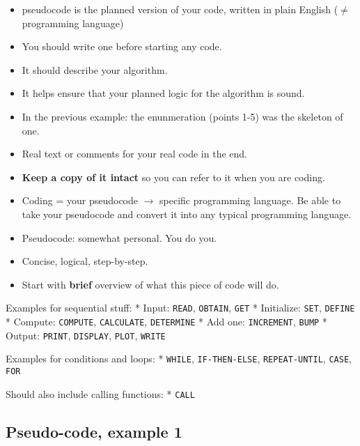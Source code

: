 \documentclass[11pt]{article}
\providecommand{\tightlist}{%
      \setlength{\itemsep}{0pt}\setlength{\parskip}{0pt}}
\begin{document}
\begin{itemize}
\tightlist
\item
  pseudocode is the planned version of your code, written in plain
  English (\(\neq\) programming language)
\item
  You should write one before starting any code.
\item
  It should describe your algorithm.
\item
  It helps ensure that your planned logic for the algorithm is sound.
\item
  In the previous example: the enunmeration (points 1-5) was the
  skeleton of one.
\end{itemize}

    \begin{itemize}
\tightlist
\item
  Real text or comments for your real code in the end.
\item
  \textbf{Keep a copy of it intact} so you can refer to it when you are
  coding.
\item
  Coding = your pseudocode \(\to\) specific programming language. Be
  able to take your pseudocode and convert it into any typical
  programming language.
\end{itemize}

    \begin{itemize}
\tightlist
\item
  Pseudocode: somewhat personal. You do you.
\item
  Concise, logical, step-by-step.
\item
  Start with \textbf{brief} overview of what this piece of code will do.
\end{itemize}

Examples for sequential stuff: * Input: \texttt{READ}, \texttt{OBTAIN},
\texttt{GET} * Initialize: \texttt{SET}, \texttt{DEFINE} * Compute:
\texttt{COMPUTE}, \texttt{CALCULATE}, \texttt{DETERMINE} * Add one:
\texttt{INCREMENT}, \texttt{BUMP} * Output: \texttt{PRINT},
\texttt{DISPLAY}, \texttt{PLOT}, \texttt{WRITE}

    Examples for conditions and loops: * \texttt{WHILE},
\texttt{IF-THEN-ELSE}, \texttt{REPEAT-UNTIL}, \texttt{CASE},
\texttt{FOR}

Should also include calling functions: * \texttt{CALL}

    \hypertarget{pseudo-code-example-1}{%
\subsection{Pseudo-code, example 1}\label{pseudo-code-example-1}}
\end{document}

